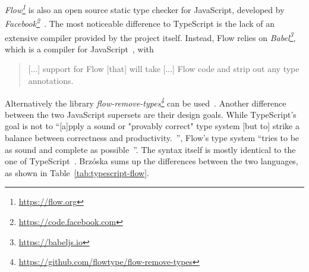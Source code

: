 \emph{Flow\footnote{\url{https://flow.org}}} is also an open source static type checker for JavaScript, developed by \emph{Facebook\footnote{\url{https://code.facebook.com}}}~\cite{FacebookCode:Flow}. The most noticeable difference to TypeScript is the lack of an extensive compiler provided by the project itself. Instead, Flow relies on \emph{Babel\footnote{\url{https://babeljs.io}}}, which is a compiler for JavaScript~\cite{BabelWebsite}, with
\begin{quote}
  [...] support for Flow [that] will take [...] Flow code and strip out any type annotations.~\cite{FlowDocs:Install}
\end{quote}
Alternatively the library \emph{flow-remove-types\footnote{\url{https://github.com/flowtype/flow-remove-types}}} can be used~\cite{FlowDocs:Install}. Another difference between the two JavaScript supersets are their design goals. While TypeScript's goal is not to ``[a]pply a sound or "provably correct" type system [but to] strike a balance between correctness and productivity.~\cite{TypeScriptWiki:DesignGoals}'', Flow's type system ``tries to be as sound and complete as possible~\cite{FlowDocs:TypesAndExpressions}''. The syntax itself is mostly identical to the one of TypeScript~\cite{FlowDocs:TypesAnnotations}. Brzóska sums up the differences between the two languages, as shown in Table~\ref{tab:typescript-flow}.

